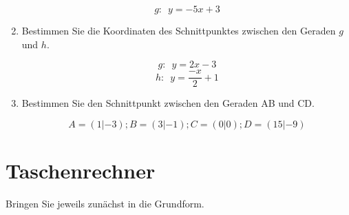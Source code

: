 \begin{enumerate}[label=\alph*)]
$$g: \,\,\,  y= -5x + 3$$


\item Bestimmen Sie die Koordinaten des Schnittpunktes zwischen den
Geraden $g$ und $h$.

$$g: \,\,\,  y= 2x - 3$$
$$h: \,\,\,  y= \frac{-x}2 +1$$

\item Bestimmen Sie den Schnittpunkt zwischen den Geraden AB und CD.


$$A=(1|-3); B=(3|-1); C=(0|0); D=(15|-9)$$


\end{enumerate}
\newpage

\section{Taschenrechner}
Bringen Sie jeweils zunächst in die Grundform.


